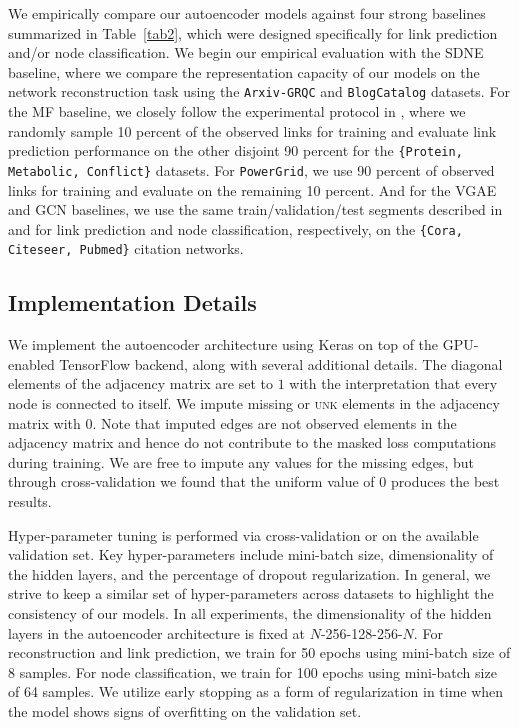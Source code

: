 \documentclass[letterpaper, conference]{IEEEtran}
\begin{document}
We empirically compare our autoencoder models against four strong baselines summarized in Table~\ref{tab2}, which were designed specifically for link prediction and/or node classification. We begin our empirical evaluation with the SDNE \cite{Wang:2016} baseline, where we compare the representation capacity of our models on the network reconstruction task using the \texttt{Arxiv-GRQC} and \texttt{BlogCatalog} datasets. For the MF baseline, we closely follow the experimental protocol in \cite{Menon:2011}, where we randomly sample 10 percent of the observed links for training and evaluate link prediction performance on the other disjoint 90 percent for the \texttt{\{Protein, Metabolic, Conflict\}} datasets. For \texttt{PowerGrid}, we use 90 percent of observed links for training and evaluate on the remaining 10 percent. And for the VGAE and GCN baselines, we use the same train/validation/test segments described in \cite{VGAE:2016} and \cite{Kipf:2016} for link prediction and node classification, respectively, on the \texttt{\{Cora, Citeseer, Pubmed\}} citation networks.

\subsection{Implementation Details}
We implement the autoencoder architecture using Keras \cite{Keras} on top of the GPU-enabled TensorFlow \cite{TF} backend, along with several additional details. The diagonal elements of the adjacency matrix are set to $1$ with the interpretation that every node is connected to itself. We impute missing or \textsc{unk} elements in the adjacency matrix with $0$. Note that imputed edges are not observed elements in the adjacency matrix and hence do not contribute to the masked loss computations during training. We are free to impute any values for the missing edges, but through cross-validation we found that the uniform value of $0$ produces the best results.

Hyper-parameter tuning is performed via cross-validation or on the available validation set. Key hyper-parameters include mini-batch size, dimensionality of the hidden layers, and the percentage of dropout regularization. In general, we strive to keep a similar set of hyper-parameters across datasets to highlight the consistency of our models. In all experiments, the dimensionality of the hidden layers in the autoencoder architecture is fixed at $N$-256-128-256-$N$. For reconstruction and link prediction, we train for 50 epochs using mini-batch size of 8 samples. For node classification, we train for 100 epochs using mini-batch size of 64 samples. We utilize early stopping as a form of regularization in time when the model shows signs of overfitting on the validation set.
\end{document}
